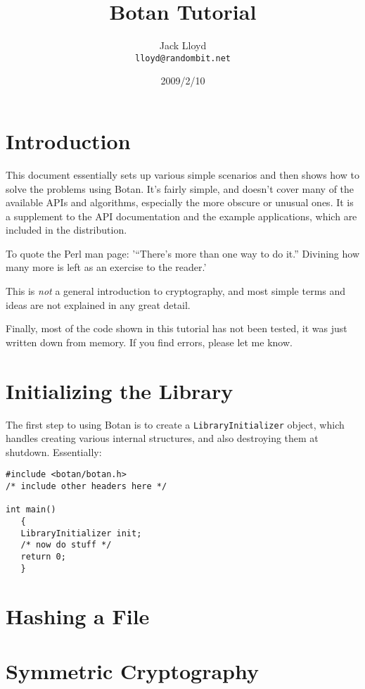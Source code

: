 \documentclass{article}
\title{\textbf{Botan Tutorial}}
\author{Jack Lloyd \\
        \texttt{lloyd@randombit.net}}
\date{2009/2/10}
\newcommand{\type}[1]{\texttt{#1}}
\begin{document}
\maketitle

\tableofcontents

\parskip=5pt
\pagebreak

\section{Introduction}

This document essentially sets up various simple scenarios and then
shows how to solve the problems using Botan. It's fairly simple, and
doesn't cover many of the available APIs and algorithms, especially
the more obscure or unusual ones. It is a supplement to the API
documentation and the example applications, which are included in the
distribution.

To quote the Perl man page: '``There's more than one way to do it.'' Divining
how many more is left as an exercise to the reader.'

This is \emph{not} a general introduction to cryptography, and most simple
terms and ideas are not explained in any great detail.

Finally, most of the code shown in this tutorial has not been tested, it was
just written down from memory. If you find errors, please let me know.

\section{Initializing the Library}

The first step to using Botan is to create a \type{LibraryInitializer} object,
which handles creating various internal structures, and also destroying them at
shutdown. Essentially:

\begin{verbatim}
#include <botan/botan.h>
/* include other headers here */

int main()
   {
   LibraryInitializer init;
   /* now do stuff */
   return 0;
   }
\end{verbatim}

\section{Hashing a File}



\section{Symmetric Cryptography}
\end{document}
